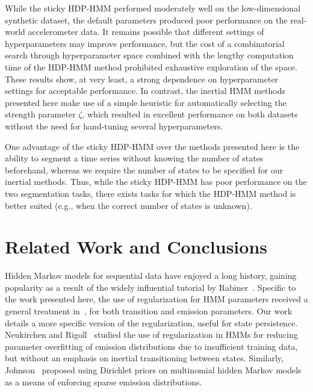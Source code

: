 \documentclass[12pt]{article}
\begin{document}
While the sticky HDP-HMM performed moderately well on the low-dimensional synthetic dataset, the default parameters produced poor performance on the real-world accelerometer data. It remains possible that different settings of hyperparameters may improve performance, but the cost of a combinatorial search through hyperparameter space combined with the lengthy computation time of the HDP-HMM method prohibited exhaustive exploration of the space. These results show, at very least, a strong dependence on hyperparameter settings for acceptable performance. In contrast, the inertial HMM methods presented here make use of a simple heuristic for automatically selecting the strength parameter $\zeta$, which resulted in excellent performance on both datasets without the need for hand-tuning several hyperparameters. 

One advantage of the sticky HDP-HMM over the methods presented here is the ability to segment a time series without knowing the number of states beforehand, whereas we require the number of states to be specified for our inertial methods. Thus, while the sticky HDP-HMM has poor performance on the two segmentation tasks, there exists tasks for which the HDP-HMM method is better suited (e.g., when the correct number of states is unknown).

\section{Related Work and Conclusions}

Hidden Markov models for sequential data have enjoyed a long history, gaining popularity as a result of the widely influential tutorial by Rabiner~\cite{rabiner1989tutorial}. Specific to the work presented here, the use of regularization for HMM parameters received a general treatment in~\cite{MAP1994}, for both transition and emission parameters. Our work details a more specific version of the regularization, useful for state persistence. Neukirchen and Rigoll~\cite{neukirchen1999controlling} studied the use of regularization in HMMs for reducing parameter overfitting of emission distributions due to insufficient training data, but without an emphasis on inertial transitioning between states. Similarly, Johnson~\cite{Johnson07whydoesnt} proposed using Dirichlet priors on multinomial hidden Markov models as a means of enforcing sparse emission distributions. 
\end{document}
